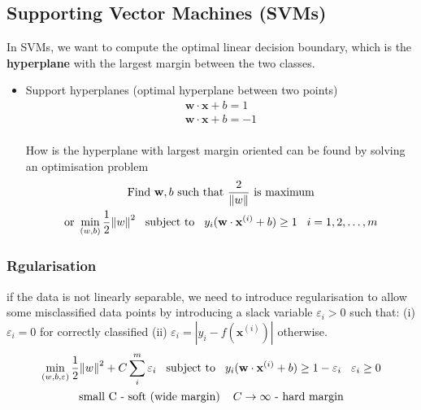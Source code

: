 \documentclass[a4paper,10pt]{article}
\begin{document}
\subsection{Supporting Vector Machines (SVMs)}
In SVMs, we want to compute the optimal linear decision boundary, which is the \textbf{hyperplane} with the largest margin between the two classes.
\begin{itemize}
    \item Support hyperplanes (optimal hyperplane between two points)
    \begin{gather*}
        \mathbf{w}\cdot\mathbf{x} + b = 1\\
        \mathbf{w}\cdot\mathbf{x} + b = -1\\
    \end{gather*}

    \vspace*{-0.8cm}
    How is the hyperplane with largest margin oriented can be found by solving an optimisation problem
    \begin{gather*}
        \text{Find }\mathbf{w},b\text{ such that }\frac{2}{\lVert w \rVert}\text{ is maximum}\\
        \text{or }\min\limits_{(w,b)}\frac{1}{2}{\lVert w \rVert}^2\hspace*{0.3cm}\text{subject to}\hspace*{0.3cm}y_i(\mathbf{w}\cdot\mathbf{x}^{(i)}+b)\geq1\hspace*{0.3cm}i = 1,2,\dots,m
    \end{gather*}
\end{itemize}

\subsubsection{Rgularisation}
if the data is not linearly separable, we need to introduce regularisation to allow some misclassified data points by introducing a slack variable $\varepsilon_i>0$ such that: (i) $\varepsilon_i=0$ for correctly classified (ii) $\varepsilon_i=\left| y_i-f(\mathbf{x}^{(i)})\right|$ otherwise. 
\begin{gather*}
    \min\limits_{(w,b,\varepsilon)}\frac{1}{2}{\lVert w \rVert}^2+C\sum_{i}^{m}\varepsilon_i\hspace*{0.3cm}\text{subject to}\hspace*{0.3cm}y_i(\mathbf{w}\cdot\mathbf{x}^{(i)}+b)\geq1-\varepsilon_i\hspace*{0.3cm}\varepsilon_i\geq0\\
    \text{small C - soft (wide margin)}\hspace*{0.4cm}C\rightarrow\infty\text{ - hard margin}
\end{gather*}
\end{document}
